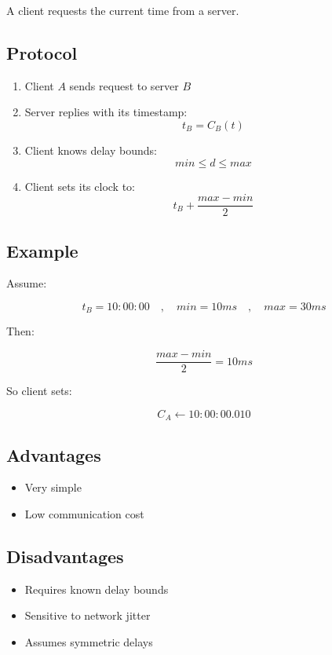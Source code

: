 A client requests the current time from a server.

\subsection{Protocol}

\begin{enumerate}
    \item Client \(A\) sends request to server \(B\)
    \item Server replies with its timestamp:
    \[
    t_B = C_B(t)
    \]
    \item Client knows delay bounds:
    \[
    min \le d \le max
    \]
    \item Client sets its clock to:
    \[
    t_B + \frac{max - min}{2}
    \]
\end{enumerate}


\subsection{Example}

Assume:

\[
t_B = 10:00:00
\quad,\quad
min = 10ms
\quad,\quad
max = 30ms
\]

Then:

\[
\frac{max - min}{2} = 10ms
\]

So client sets:

\[
C_A \leftarrow 10:00:00.010
\]


\subsection{Advantages}

\begin{itemize}
    \item Very simple
    \item Low communication cost
\end{itemize}

\subsection{Disadvantages}

\begin{itemize}
    \item Requires known delay bounds
    \item Sensitive to network jitter
    \item Assumes symmetric delays
\end{itemize}


